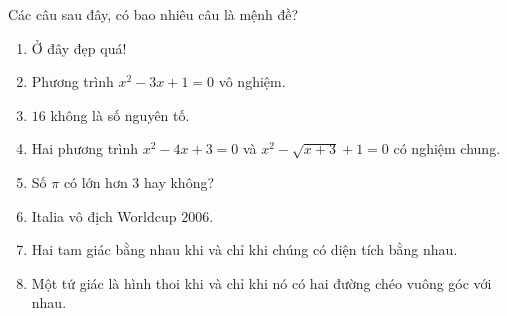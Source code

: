 \begin{bt}%
	Các câu sau đây, có bao nhiêu  câu là mệnh đề?
	\begin{enumerate}
		\item Ở  đây đẹp quá!
		\item Phương  trình $x^2-3x+1=0$ vô nghiệm.
		\item $16$ không  là số nguyên tố.
		\item Hai phương trình $x^2-4x+3=0$ và $x^2-\sqrt{x+3}+1=0$ có  nghiệm chung.
		\item Số $\pi$ có lớn hơn $3$  hay không?
		 \item Italia vô địch Worldcup $2006$.
		\item Hai tam giác bằng nhau khi và  chỉ khi chúng có diện tích bằng nhau.
		\item Một tứ giác là hình thoi khi và chỉ khi nó có hai đường  chéo vuông góc với nhau.
	\end{enumerate}
\end{bt}

